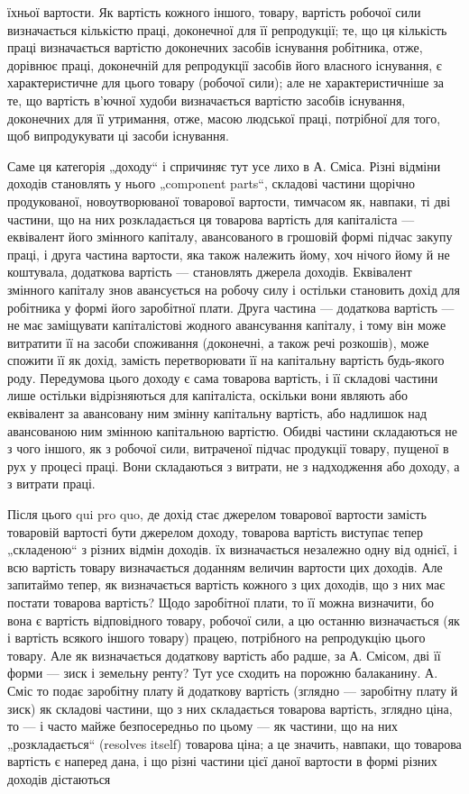 їхньої вартости. Як вартість кожного іншого, товару, вартість робочої
сили визначається кількістю праці, доконечної для її репродукції; те, що
ця кількість праці визначається вартістю доконечних засобів існування
робітника, отже, дорівнює праці, доконечній для репродукції засобів його
власного існування, є характеристичне для цього товару (робочої сили);
але не характеристичніше за те, що вартість в’ючної худоби визначається
вартістю засобів існування, доконечних для її утримання, отже,
масою людської праці, потрібної для того, щоб випродукувати ці засоби
існування.

Саме ця категорія „доходу“ і спричиняє тут усе лихо в А. Сміса.
Різні відміни доходів становлять у нього „component parts“, складові
частини щорічно продукованої, новоутворюваної товарової вартости, тимчасом
як, навпаки, ті дві частини, що на них розкладається ця товарова
вартість для капіталіста — еквівалент його змінного капіталу, авансованого
в грошовій формі підчас закупу праці, і друга частина вартости, яка також
належить йому, хоч нічого йому й не коштувала, додаткова вартість —
становлять джерела доходів. Еквівалент змінного капіталу знов авансується
на робочу силу і остільки становить дохід для робітника у формі його
заробітної плати. Друга частина — додаткова вартість — не має заміщувати
капіталістові жодного авансування капіталу, і тому він може витратити її
на засоби споживання (доконечні, а також речі розкошів), може спожити її
як дохід, замість перетворювати її на капітальну вартість будь-якого роду.
Передумова цього доходу є сама товарова вартість, і її складові частини
лише остільки відрізняються для капіталіста, оскільки вони являють або
еквівалент за авансовану ним змінну капітальну вартість, або надлишок
над авансованою ним змінною капітальною вартістю. Обидві частини складаються
не з чого іншого, як з робочої сили, витраченої підчас продукції
товару, пущеної в рух у процесі праці. Вони складаються з витрати,
не з надходження або доходу, а з витрати праці.

Після цього qui pro quo, де дохід стає джерелом товарової вартости
замість товаровій вартості бути джерелом доходу, товарова
вартість виступає тепер „складеною“ з різних відмін доходів. їх
визначається незалежно одну від однієї, і всю вартість товару визначається
доданням величин вартости цих доходів. Але запитаймо тепер,
як визначається вартість кожного з цих доходів, що з них має постати
товарова вартість? Щодо заробітної плати, то її можна визначити, бо вона
є вартість відповідного товару, робочої сили, а цю останню визначається
(як і вартість всякого іншого товару) працею, потрібного на репродукцію
цього товару. Але як визначається додаткову вартість або радше, за А.
Смісом, дві її форми — зиск і земельну ренту? Тут усе сходить на порожню
балаканину. А. Сміс то подає заробітну плату й додаткову вартість
(зглядно — заробітну плату й зиск) як складові частини, що з них складається
товарова вартість, зглядно ціна, то — і часто майже безпосередньо
по цьому — як частини, що на них „розкладається“ (resolves itself) товарова
ціна; а це значить, навпаки, що товарова вартість є наперед дана,
і що різні частини цієї даної вартости в формі різних доходів дістаються
